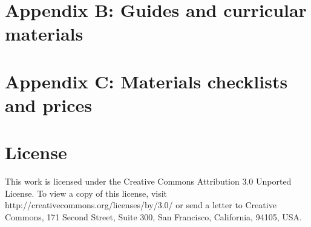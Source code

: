 \documentclass[11pt]{report}
\begin{document}
\chapter*{Appendix B: Guides and curricular materials}


\chapter*{Appendix C: Materials checklists and prices}



\nocite{*}
{\small


}

\chapter*{License}

This work is licensed under the Creative Commons Attribution 3.0 Unported License. To view a copy of this license, visit http://creativecommons.org/licenses/by/3.0/ or send a letter to Creative Commons, 171 Second Street, Suite 300, San Francisco, California, 94105, USA.
\end{document}

